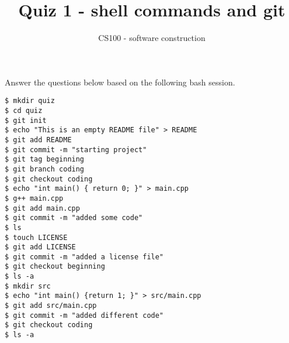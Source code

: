 \documentclass{article}
\title{Quiz 1 - shell commands and git}
\author{CS100 - software construction}
\begin{document}
\maketitle

\noindent
Answer the questions below based on the following bash session.

\begin{lstlisting}
$ mkdir quiz
$ cd quiz
$ git init
$ echo "This is an empty README file" > README
$ git add README
$ git commit -m "starting project"
$ git tag beginning
$ git branch coding
$ git checkout coding
$ echo "int main() { return 0; }" > main.cpp
$ g++ main.cpp
$ git add main.cpp
$ git commit -m "added some code"
$ ls 
$ touch LICENSE
$ git add LICENSE
$ git commit -m "added a license file"
$ git checkout beginning
$ ls -a
$ mkdir src
$ echo "int main() {return 1; }" > src/main.cpp
$ git add src/main.cpp
$ git commit -m "added different code"
$ git checkout coding
$ ls -a
\end{lstlisting}
\end{document}
